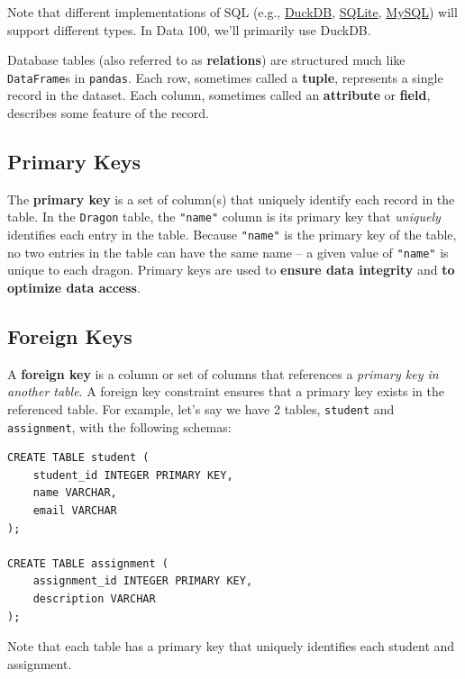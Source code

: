 \documentclass[
  letterpaper,
  DIV=11,
  numbers=noendperiod]{scrreprt}
\begin{document}
Note that different implementations of SQL (e.g.,
\href{https://duckdb.org/docs/sql/data_types/overview.html}{DuckDB},
\href{https://www.sqlite.org/datatype3.html}{SQLite},
\href{https://dev.mysql.com/doc/refman/8.0/en/data-types.html}{MySQL})
will support different types. In Data 100, we'll primarily use DuckDB.

Database tables (also referred to as \textbf{relations}) are structured
much like \texttt{DataFrame}s in \texttt{pandas}. Each row, sometimes
called a \textbf{tuple}, represents a single record in the dataset. Each
column, sometimes called an \textbf{attribute} or \textbf{field},
describes some feature of the record.

\subsection{Primary Keys}\label{primary-keys}

The \textbf{primary key} is a set of column(s) that uniquely identify
each record in the table. In the \texttt{Dragon} table, the
\texttt{"name"} column is its primary key that \emph{uniquely}
identifies each entry in the table. Because \texttt{"name"} is the
primary key of the table, no two entries in the table can have the same
name -- a given value of \texttt{"name"} is unique to each dragon.
Primary keys are used to \textbf{ensure data integrity} and \textbf{to
optimize data access}.

\subsection{Foreign Keys}\label{foreign-keys}

A \textbf{foreign key} is a column or set of columns that references a
\emph{primary key in another table}. A foreign key constraint ensures
that a primary key exists in the referenced table. For example, let's
say we have 2 tables, \texttt{student} and \texttt{assignment}, with the
following schemas:

\begin{verbatim}
CREATE TABLE student (
    student_id INTEGER PRIMARY KEY,
    name VARCHAR,
    email VARCHAR
);

CREATE TABLE assignment (
    assignment_id INTEGER PRIMARY KEY,
    description VARCHAR
);
\end{verbatim}

Note that each table has a primary key that uniquely identifies each
student and assignment.
\end{document}
